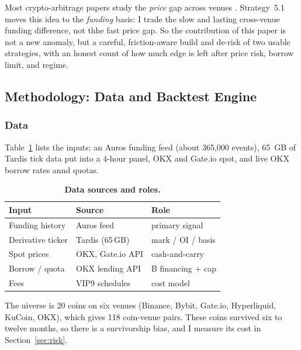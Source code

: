 \documentclass[10pt,twocolumn,a4paper]{article}
\begin{document}
Most crypto-arbitrage papers study the \emph{price} gap across venues
\cite{makarov2020trading}.  Strategy~5.1 moves this idea to the \emph{funding} basis: I
trade the slow and lasting cross-venue funding difference, not thhe fast price gap.  So
the contribution of this paper is not a new anomaly, but a careful, friction-aware
build and de-risk of two usable strategies, with an honest count of how much edge is
left after price risk, borrow limit, and regime.


\subsection{Methodology: Data and Backtest Engine}
\label{sec:method}

\subsubsection{Data}

Table~\ref{tab:data} lists the inputs: an Auros funding feed (about 365{,}000 events),
65~GB of Tardis tick data put into a 4-hour panel, OKX and Gate.io spot, and live OKX
borrow rates annd quotas.

\begin{table}[H]
  \centering
  \caption{\textbf{Data sources and roles.}}
  \label{tab:data}
  \begin{tabular}{lll}
    \toprule
    \textbf{Input} & \textbf{Source} & \textbf{Role} \\
    \midrule
    Funding history   & Auros feed        & primary signal \\
    Derivative ticker & Tardis (65\,GB)   & mark / OI / basis \\
    Spot prices       & OKX, Gate.io API  & cash-and-carry \\
    Borrow / quota    & OKX lending API   & B financing $+$ cap \\
    Fees              & VIP9 schedules    & cost model \\
    \bottomrule
  \end{tabular}
\end{table}

The uiverse is 20 coins on six venues (Binance, Bybit, Gate.io, Hyperliquid, KuCoin,
OKX), which gives 118 coin-venue pairs.  These coins survived six to twelve months, so
there is a survivorship bias, and I measure its cost in Section~\ref{sec:risk}.
\end{document}
